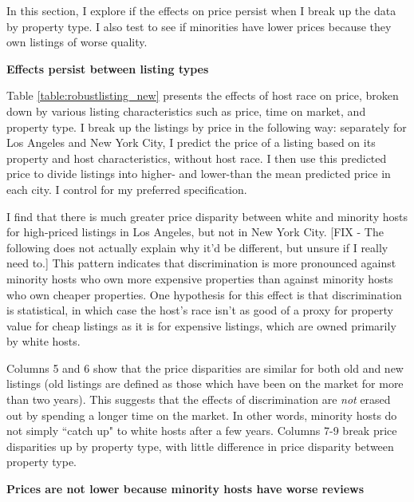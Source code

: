 
In this section, I explore if the effects on price persist when I break up the data by property type. I also test to see if minorities have lower prices because they own listings of worse quality. 

\textbf{Effects persist between listing types}

Table \ref{table:robustlisting_new} presents the effects of host race on price, broken down by various listing characteristics such as price, time on market, and property type. I break up the listings by price in the following way: separately for Los Angeles and New York City, I predict the price of a listing based on its property and host characteristics, without host race. I then use this predicted price to divide listings into higher- and lower-than the mean predicted price in each city. I control for my preferred specification.  

I find that there is much greater price disparity between white and minority hosts for high-priced listings in Los Angeles, but not in New York City. [FIX - The following does not actually explain why it'd be different, but unsure if I really need to.] This pattern indicates that discrimination is more pronounced against minority hosts who own more expensive properties than against minority hosts who own cheaper properties. One hypothesis for this effect is that discrimination is statistical, in which case the host's race isn't as good of a proxy for property value for cheap listings as it is for expensive listings, which are owned primarily by white hosts. 

Columns 5 and 6 show that the price disparities are similar for both old and new listings (old listings are defined as those which have been on the market for more than two years). This suggests that the effects of discrimination are \textit{not} erased out by spending a longer time on the market. In other words, minority hosts do not simply ``catch up" to white hosts after a few years. Columns 7-9 break price disparities up by property type, with little difference in price disparity between property type. 

\textbf{Prices are not lower because minority hosts have worse reviews} 

